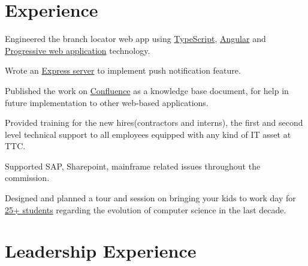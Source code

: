 \documentclass[]{deedy-resume-openfont}
\begin{document}
\hfill
\begin{minipage}[t]{0.66\textwidth} 


\section{Experience}

\vspace{\topsep} %
\begin{tightemize}

\item Engineered the branch locator web app using \underline{TypeScript},  \underline{Angular} and \underline{Progressive web application} technology.
\item Wrote an \underline{Express server} to implement push notification feature.
\item Published the work on \underline{Confluence} as a knowledge base document, for help in future implementation to other web-based applications.  
\end{tightemize}
\sectionsep

\vspace{\topsep} %
\begin{tightemize}
\item Provided training for the new hires(contractors and interns), the first and second level technical support to all employees equipped with any kind of IT asset at TTC. 
\item Supported SAP, Sharepoint, mainframe related issues throughout the commission.
\item Designed and planned a tour and session on bringing your kids to work day for \underline{25+ students} regarding the evolution of computer science in the last decade.
\end{tightemize}
\sectionsep



\section{Leadership Experience}


\end{minipage}
\end{document}

